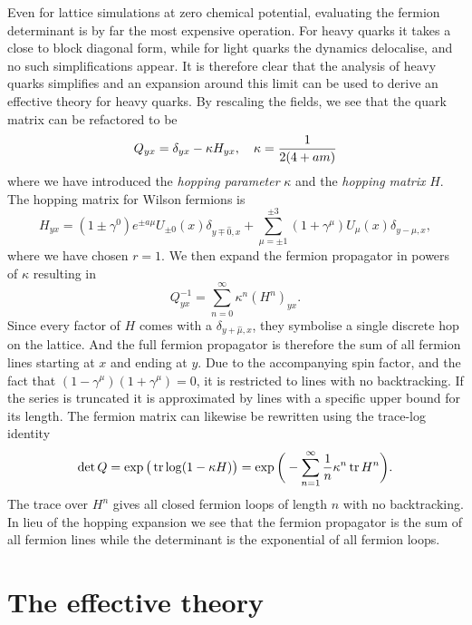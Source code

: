 Even for lattice simulations at zero chemical potential, evaluating the fermion
determinant is by far the most expensive operation. For heavy quarks it takes a
close to block diagonal form, while for light quarks the dynamics delocalise,
and no such simplifications appear. It is therefore clear that the analysis of
heavy quarks simplifies and an expansion around this limit can be used to derive
an effective theory for heavy quarks. By rescaling the fields, we see that the
quark matrix can be refactored to be
%
\begin{equation}
  Q_{yx} = \delta_{yx} - \kappa H_{yx}, \hskip1em \kappa = \frac{1}{2(4 + am)}
\end{equation}
%
where we have introduced the \emph{hopping parameter} $\kappa$ and the
\emph{hopping matrix} $H$. The hopping matrix for Wilson fermions is
%
\begin{equation}
  H_{yx} = (1 \pm \gamma^0) e^{\pm a\mu} U_{\pm 0}(x) \delta_{y \mp \hat{0},x}
    + \sum_{\mu = \pm 1}^{\pm 3} (1 + \gamma^{\mu}) U_{\mu}(x) \delta_{y-\hat{\mu},x},
\end{equation}
%
where we have chosen $r=1$. We then expand the fermion propagator in powers of
$\kappa$ resulting in
%
\begin{equation}
  Q^{-1}_{yx} = \sum_{n=0}^{\infty} \kappa^n (H^n)_{yx} .
\end{equation}
%
Since every factor of $H$ comes with a $\delta_{y+\hat{\mu},x}$, they symbolise
a single discrete hop on the lattice. And the full fermion propagator is
therefore the sum of all fermion lines starting at $x$ and ending at $y$. Due to
the accompanying spin factor, and the fact that $(1 - \gamma^{\mu}) (1 +
\gamma^{\mu}) = 0$, it is restricted to lines with no backtracking.  If the
series is truncated it is approximated by lines with a specific upper bound for
its length. The fermion matrix can likewise be rewritten using the trace-log
identity
%
\begin{equation}
  \det Q = \exp \big(\operatorname{tr} \log (1 - \kappa H) \big) = \exp \bigg( -\sum_{n=1}^{\infty} \frac{1}{n}
  \kappa^n \operatorname{tr} H^n \bigg).
\end{equation}
%
The trace over $H^n$ gives all closed fermion loops of length $n$ with no
backtracking. In lieu of the hopping expansion we see that the fermion
propagator is the sum of all fermion lines while the determinant is the
exponential of all fermion loops.

\section{The effective theory}

